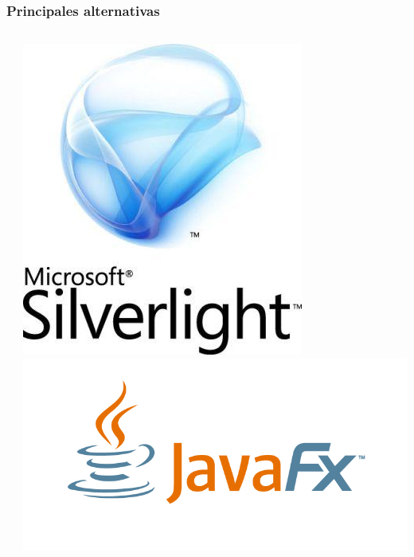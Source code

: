 \documentclass{beamer}
\begin{document}
\begin{frame}
     \frametitle{Principales alternativas}
     
     
     \begin{columns}[c]
     \begin{column}{5cm}
     \end{column}
     \begin{column}{5cm}
        \includegraphics[scale=0.2]{microsoft_silverlight_c.jpg}\\
        \includegraphics[scale=0.3]{javafx_logo_color_1.jpg}\\

\end{column}
\end{columns}
\end{frame}
\end{document}
